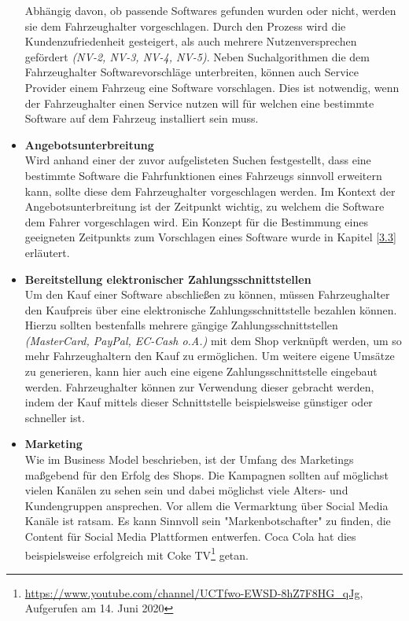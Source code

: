\begin{itemize}
	Abhängig davon, ob passende Softwares gefunden wurden oder nicht, werden sie dem Fahrzeughalter vorgeschlagen. Durch den Prozess wird die Kundenzufriedenheit gesteigert, als auch mehrere Nutzenversprechen gefördert \textit{(NV-2, NV-3, NV-4, NV-5)}. Neben Suchalgorithmen die dem Fahrzeughalter Softwarevorschläge unterbreiten, können auch Service Provider einem Fahrzeug eine Software vorschlagen. Dies ist notwendig, wenn der Fahrzeughalter einen Service nutzen will für welchen eine bestimmte Software auf dem Fahrzeug installiert sein muss.

	\item[] \hspace{-0.6cm} \textbf{Angebotsunterbreitung}\\
	Wird anhand einer der zuvor aufgelisteten Suchen festgestellt, dass eine bestimmte Software die Fahrfunktionen eines Fahrzeugs sinnvoll erweitern kann, sollte diese dem Fahrzeughalter vorgeschlagen werden. Im Kontext der Angebotsunterbreitung ist der Zeitpunkt wichtig, zu welchem die Software dem Fahrer vorgeschlagen wird. Ein Konzept für die Bestimmung eines geeigneten Zeitpunkts zum Vorschlagen eines Software wurde in Kapitel \ref{3.3} erläutert.
	
	\item[] \hspace{-0.6cm} \textbf{Bereitstellung elektronischer Zahlungsschnittstellen}\\
	Um den Kauf einer Software abschließen zu können, müssen Fahrzeughalter den Kaufpreis über eine elektronische Zahlungsschnittstelle bezahlen können. Hierzu sollten bestenfalls mehrere gängige Zahlungsschnittstellen \textit{(MasterCard, PayPal, EC-Cash o.A.)} mit dem Shop verknüpft werden, um so mehr Fahrzeughaltern den Kauf zu ermöglichen. Um weitere eigene Umsätze zu generieren, kann hier auch eine eigene Zahlungsschnittstelle eingebaut werden. Fahrzeughalter können zur Verwendung dieser gebracht werden, indem der Kauf mittels dieser Schnittstelle beispielsweise günstiger oder schneller ist.
	
	\item[] \hspace{-0.6cm} \textbf{Marketing}\\
	Wie im Business Model beschrieben, ist der Umfang des Marketings maßgebend für den Erfolg des Shops. Die Kampagnen sollten auf möglichst vielen Kanälen zu sehen sein und dabei möglichst viele Alters- und Kundengruppen ansprechen. Vor allem die Vermarktung über Social Media Kanäle ist ratsam. Es kann Sinnvoll sein "Markenbotschafter" zu finden, die Content für Social Media Plattformen entwerfen. Coca Cola hat dies beispielsweise erfolgreich mit Coke TV\footnote{\url{https://www.youtube.com/channel/UCTfwo-EWSD-8hZ7F8HG_qJg}, Aufgerufen am 14. Juni 2020} getan.
\end{itemize}
